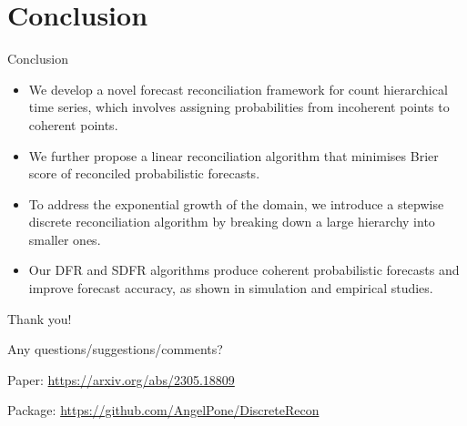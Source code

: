 \documentclass[12pt]{beamer}
\begin{document}
\section{Conclusion}

\begin{frame}{Conclusion}
    \begin{itemize}
        \item We develop a novel forecast reconciliation framework for count hierarchical time series, which involves assigning probabilities from incoherent points to coherent points.
        \item We further propose a linear reconciliation algorithm that minimises Brier score of reconciled probabilistic forecasts.
        \item To address the exponential growth of the domain, we introduce a stepwise discrete reconciliation algorithm by breaking down a large hierarchy into smaller ones.
        \item Our DFR and SDFR algorithms produce coherent probabilistic forecasts and improve forecast accuracy, as shown in simulation and empirical studies.
    \end{itemize}
\end{frame}


{
\begin{frame}
\begin{minipage}[t][0.8\textheight][c]{\textwidth}
\centering
\fontsize{15}{18}\selectfont
Thank you!

Any questions/suggestions/comments?    

\end{minipage}


Paper: \url{https://arxiv.org/abs/2305.18809}

Package: \url{https://github.com/AngelPone/DiscreteRecon}

\end{frame}}
\end{document}

